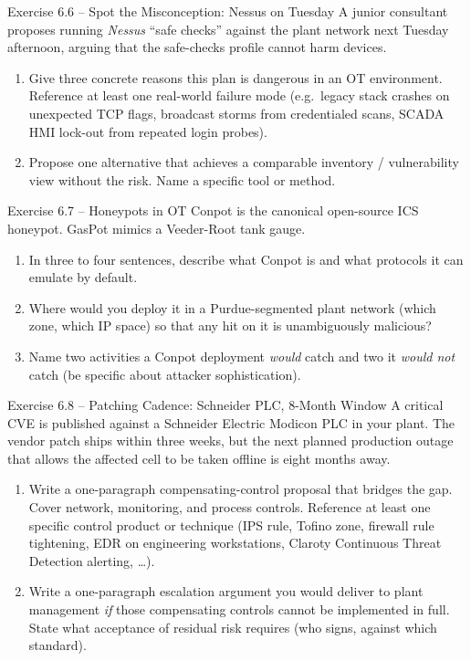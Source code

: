 \documentclass[11pt,a4paper]{article}
\begin{document}
\begin{taskbox}{Exercise 6.6 -- Spot the Misconception: Nessus on Tuesday}
A junior consultant proposes running \emph{Nessus} ``safe checks''
against the plant network next Tuesday afternoon, arguing that the
safe-checks profile cannot harm devices.

\begin{enumerate}
  \item Give three concrete reasons this plan is dangerous in an OT
        environment. Reference at least one real-world failure mode
        (e.g.\ legacy stack crashes on unexpected TCP flags, broadcast
        storms from credentialed scans, SCADA HMI lock-out from
        repeated login probes).
  \item Propose one alternative that achieves a comparable
        inventory / vulnerability view without the risk. Name a
        specific tool or method.
\end{enumerate}
\end{taskbox}

\begin{taskbox}{Exercise 6.7 -- Honeypots in OT}
Conpot is the canonical open-source ICS honeypot. GasPot mimics a
Veeder-Root tank gauge.

\begin{enumerate}
  \item In three to four sentences, describe what Conpot is and what
        protocols it can emulate by default.
  \item Where would you deploy it in a Purdue-segmented plant network
        (which zone, which IP space) so that any hit on it is
        unambiguously malicious?
  \item Name two activities a Conpot deployment \emph{would} catch
        and two it \emph{would not} catch (be specific about attacker
        sophistication).
\end{enumerate}
\end{taskbox}

\begin{taskbox}{Exercise 6.8 -- Patching Cadence: Schneider PLC, 8-Month Window}
A critical CVE is published against a Schneider Electric Modicon PLC
in your plant. The vendor patch ships within three weeks, but the next
planned production outage that allows the affected cell to be taken
offline is eight months away.

\begin{enumerate}
  \item Write a one-paragraph compensating-control proposal that
        bridges the gap. Cover network, monitoring, and process
        controls. Reference at least one specific control product or
        technique (IPS rule, Tofino zone, firewall rule tightening,
        EDR on engineering workstations, Claroty Continuous Threat
        Detection alerting, \ldots).
  \item Write a one-paragraph escalation argument you would deliver
        to plant management \emph{if} those compensating controls
        cannot be implemented in full. State what acceptance of
        residual risk requires (who signs, against which standard).
\end{enumerate}
\end{taskbox}
\end{document}
